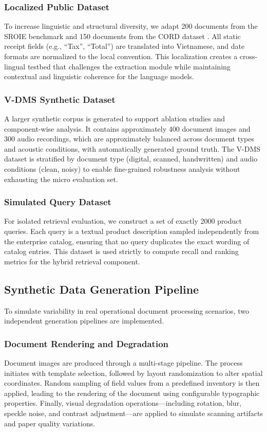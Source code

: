 \subsubsection{Localized Public Dataset}
To increase linguistic and structural diversity, we adapt 200 documents from the SROIE benchmark \parencite{huang2019icdar2019} and 150 documents from the CORD dataset \parencite{park2019cord}. All static receipt fields (e.g., ``Tax'', ``Total'') are translated into Vietnamese, and date formats are normalized to the local convention. This localization creates a cross-lingual testbed that challenges the extraction module while maintaining contextual and linguistic coherence for the language models.

\subsubsection{V-DMS Synthetic Dataset}
A larger synthetic corpus is generated to support ablation studies and component-wise analysis. It contains approximately 400 document images and 300 audio recordings, which are approximately balanced across document types and acoustic conditions, with automatically generated ground truth. The V-DMS dataset is stratified by document type (digital, scanned, handwritten) and audio conditions (clean, noisy) to enable fine-grained robustness analysis without exhausting the micro evaluation set.

\subsubsection{Simulated Query Dataset}
For isolated retrieval evaluation, we construct a set of exactly 2000 product queries. Each query is a textual product description sampled independently from the enterprise catalog, ensuring that no query duplicates the exact wording of catalog entries. This dataset is used strictly to compute recall and ranking metrics for the hybrid retrieval component.

\subsection{Synthetic Data Generation Pipeline}
To simulate variability in real operational document processing scenarios, two independent generation pipelines are implemented.

\subsubsection{Document Rendering and Degradation}
Document images are produced through a multi-stage pipeline. The process initiates with template selection, followed by layout randomization to alter spatial coordinates. Random sampling of field values from a predefined inventory is then applied, leading to the rendering of the document using configurable typographic properties. Finally, visual degradation operations---including rotation, blur, speckle noise, and contrast adjustment---are applied to simulate scanning artifacts and paper quality variations.

